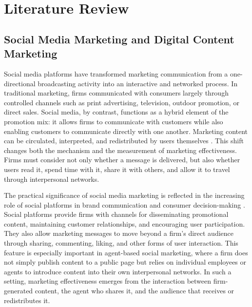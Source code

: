 ﻿\chapter{Literature Review}
\label{chap:literature-review}

\section{Social Media Marketing and Digital Content Marketing}
\label{sec:2-1-social-media-marketing-and-digital-content-marketing}

Social media platforms have transformed marketing communication from a one-directional broadcasting activity into an interactive and networked process. In traditional marketing, firms communicated with consumers largely through controlled channels such as print advertising, television, outdoor promotion, or direct sales. Social media, by contrast, functions as a hybrid element of the promotion mix: it allows firms to communicate with customers while also enabling customers to communicate directly with one another. Marketing content can be circulated, interpreted, and redistributed by users themselves \parencite{kaplan2010,mangold2009}. This shift changes both the mechanism and the measurement of marketing effectiveness. Firms must consider not only whether a message is delivered, but also whether users read it, spend time with it, share it with others, and allow it to travel through interpersonal networks.

The practical significance of social media marketing is reflected in the increasing role of social platforms in brand communication and consumer decision-making \parencite{curalate2017,lamontagne2015,pwc2018,read2018}. Social platforms provide firms with channels for disseminating promotional content, maintaining customer relationships, and encouraging user participation. They also allow marketing messages to move beyond a firm's direct audience through sharing, commenting, liking, and other forms of user interaction. This feature is especially important in agent-based social marketing, where a firm does not simply publish content to a public page but relies on individual employees or agents to introduce content into their own interpersonal networks. In such a setting, marketing effectiveness emerges from the interaction between firm-generated content, the agent who shares it, and the audience that receives or redistributes it.

